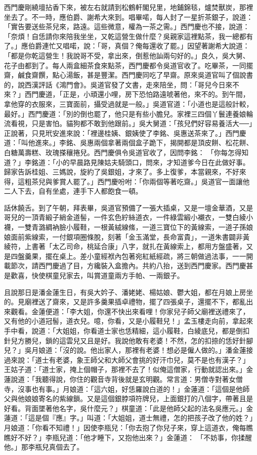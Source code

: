 西門慶剛繞壇拈香下來，被左右就請到松鶴軒閣兒里，地鋪錦毯，爐焚獸炭，那裡坐去了。不一時，應伯爵、謝希大來到。唱畢喏，每人封了一星折茶銀子，說道： 「實告要送些茶兒來，路遠。這些微意，權為一茶之需。」西門慶也不接，說道：「奈煩！自恁請你來陪我坐坐，又乾這營生做什麼？吳親家這裡點茶，我一總都有了。」應伯爵連忙又唱喏，說：「哥，真個？俺每還收了罷。」因望著謝希大說道：「都是你乾這營生！我說哥不受，拿出來，倒惹他訕兩句好的。」良久，吳大舅、花子由都到了。每人兩盒細茶食來點茶，西門慶都令吳道官收了。吃畢茶，一同擺齋，鹹食齋饌，點心湯飯，甚是豐潔。西門慶同吃了早齋。原來吳道官叫了個說書的，說西漢評話《鴻門會》。吳道官發了文書，走來陪坐，問：「哥兒今日來不來？」西門慶道，「正是，小頑還小哩，房下恐怕路遠唬著他，來不的。到午間，拿他穿的衣服來，三寶面前，攝受過就是一般。」吳道官道：「小道也是這般計較，最好。」西門慶道：「別的倒也罷了，他只是有些小膽兒。家裡三四個丫鬟連養娘輪流看視，只是害怕。貓狗都不敢到他跟前。」吳大舅道：「孩兒們好容易養活大──」正說著，只見玳安進來說：「裡邊桂姨、銀姨使了李銘、吳惠送茶來了。」西門慶道：「叫他進來。」李銘、吳惠兩個拿著兩個盒子跪下，揭開都是頂皮餅、松花餅、白糖萬壽糕、玫瑰搽穰捲兒。西門慶俱令吳道官收了，因問李銘： 「你每怎得知道？」李銘道：「小的早晨路見陳姑夫騎頭口，問來，才知道爹今日在此做好事。歸家告訴桂姐、三媽說，旋約了吳銀姐，才來了。多上復爹，本當親來，不好來得，這粗茶兒與爹賞人罷了。」西門慶吩咐：「你兩個等著吃齋。」吳道官一面讓他二人下去，自有坐處，連手下人都飽食一頓。

話休饒舌。到了午朝，拜表畢，吳道官預備了一張大插桌，又是一壇金華酒，又是哥兒的一頂青緞子綃金道髻，一件玄色紵絲道衣，一件綠雲緞小襯衣，一雙白綾小襪，一雙青潞綢衲臉小履鞋，一根黃絨線絛，一道三寶位下的黃線索，一道子孫娘娘面前紫線索，一付銀項圈條脫，刻著「金玉滿堂，長命富貴」，一道朱書闢非黃綾符，上書著「太乙司命，桃延合康」八字，就扎在黃線索上，都用方盤盛著，又是四盤羹果，擺在桌上。差小童經袱內包著宛紅紙經疏，將三朝做過法事，一一開載節次，請西門慶過了目，方纔裝入盒擔內。共約八抬，送到西門慶家。西門慶甚是歡喜，快使棋童兒家去，叫賞道童兩方手帕、一兩銀子。

且說那日是潘金蓮生日，有吳大妗子、潘姥姥、楊姑娘、鬱大姐，都在月娘上房坐的。見廟裡送了齋來，又是許多羹果插卓禮物，擺了四張桌子，還擺不下，都亂出來觀看。金蓮便道：「李大姐，你還不快出來看哩！你家兒子師父廟裡送禮來了，又有他的小道冠髻，道衣兒。噫，你看，又是小履鞋兒！」孟玉樓走向前，拿起來手中看，說道：「大姐姐，你看道士家也恁精細，這小履鞋，白綾底兒，都是倒扣針兒方勝兒，鎖的這雲兒又且是好。我說他敢有老婆！不然，怎的扣捺的恁好針腳兒？」吳月娘道：「沒的說。他出家人，那裡有老婆！想必是僱人做的。」潘金蓮接過來說：「道士有老婆，象王師父和大師父會挑的好汗巾兒，莫不是也有漢子？」王姑子道：「道士家，掩上個帽子，那裡不去了！似俺這僧家，行動就認出來。」金蓮說道：「我聽得說，你住的觀音寺背後就是玄明觀。常言道：男僧寺對著女僧寺，沒事也有事。」月娘道：「這六姐，好恁羅說白道的！」金蓮道：「這個是他師父與他娘娘寄名的紫線鎖。又是這個銀脖項符牌兒，上面銀打的八個字，帶著且是好看。背面墜著他名字，吳什麼元？」棋童道：「此是他師父起的法名吳應元。」金蓮道：「這是個『應』字。」叫道：「大姐姐，道士無禮，怎的把孩子改了他的姓？」月娘道：「你看不知禮！」因使李瓶兒：「你去抱了你兒子來，穿上這道衣，俺每瞧瞧好不好？」李瓶兒道：「他才睡下，又抱他出來？」金蓮道： 「不妨事，你揉醒他。」那李瓶兒真個去了。

